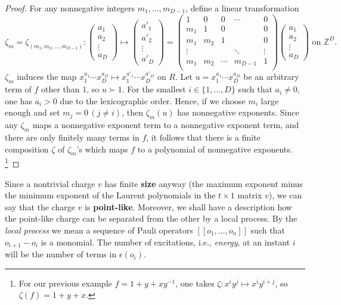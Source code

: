 \begin{proof}
For any nonnegative integers $m_1,\ldots,m_{D-1}$, define a linear transformation
\[
\zeta_m =
\zeta_{(m_1,m_2,\ldots,m_{D-1})} :
\begin{pmatrix}
 a_1 \\ a_2 \\ \vdots \\ a_D
\end{pmatrix}
\mapsto
 \begin{pmatrix}
  a'_1 \\ a'_2 \\ \vdots \\ a'_D
 \end{pmatrix}
=
\begin{pmatrix}
 1      & 0      & 0      & \cdots & 0       \\
 m_1    & 1      &  0     &        & 0       \\
 m_1    & m_2    &  1     &        & 0       \\
 \vdots &        &        & \ddots & \vdots  \\
 m_1    & m_2    & \cdots & m_{D-1}& 1       \\
\end{pmatrix}
\begin{pmatrix}
 a_1 \\ a_2 \\ \vdots \\ a_D
\end{pmatrix}
\text{ on } \mathbb{Z}^D .
\]
$\zeta_m$ induces the map $x_1^{a_1} \cdots x_D^{a_D} \mapsto x_1^{a'_1} \cdots x_D^{a'_D}$ on $R$.
Let $u=x_1^{a_1} \cdots x_D^{a_D}$ be an arbitrary term of $f$ other than $1$, so $u \succ 1$.
For the smallest $i \in \{1,\ldots,D\}$ such that $a_i \neq 0$,
one has $a_i > 0$ due to the lexicographic order.
Hence, if we choose $m_i$ large enough and set $m_j=0\,(j\neq i)$,
then $\zeta_m (u)$ has nonnegative exponents.
Since any $\zeta_{m}$ maps a nonnegative exponent term to a nonnegative exponent term,
and there are only finitely many terms in $f$,
it follows that
there is a finite composition $\zeta$ of $\zeta_m$'s 
which maps $f$ to a polynomial of nonnegative exponents.%
\footnote{
For our previous example $f = 1+y+xy^{-1}$,
one takes $\zeta : x^i y^j \mapsto x^i y^{i+j}$, so $\zeta(f) = 1 + y + x$.
}
\end{proof}


Since a nontrivial charge $v$ has finite {\bf size} anyway
(the maximum exponent minus the minimum exponent of the Laurent polynomials 
in the $t \times 1$ matrix $v$),
we can say that the charge $v$ is {\bf point-like}.
Moreover, we shall have a description how the point-like charge
can be separated from the other by a local process.
By the {\em local process} we mean a sequence of Pauli operators $[[o_1, \ldots, o_n]]$
such that $o_{i+1} - o_i$ is a monomial.
The number of excitations, i.e., {\em energy}, at an instant $i$ 
will be the number of terms in $\epsilon(o_i)$.

